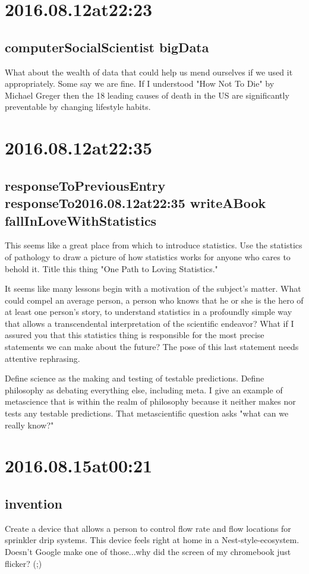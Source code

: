 \section*{ 2016.08.12at22:23 }
\subsection*{computerSocialScientist bigData}
What about the wealth of data that could help us mend ourselves if we used it appropriately. Some say we are fine. If I understood "How Not To Die" by Michael Greger then the 18 leading causes of death in the US are significantly preventable by changing lifestyle habits.

\section*{ 2016.08.12at22:35 }
\subsection*{responseToPreviousEntry responseTo2016.08.12at22:35 writeABook fallInLoveWithStatistics}
This seems like a great place from which to introduce statistics. Use the statistics of pathology to draw a picture of how statistics works for anyone who cares to behold it. Title this thing "One Path to Loving Statistics."

It seems like many lessons begin with a motivation of the subject's matter. What could compel an average person, a person who knows that he or she is the hero of at least one person's story, to understand statistics in a profoundly simple way that allows a transcendental interpretation of the scientific endeavor? What if I assured you that this statistics thing is responsible for the most precise statements we can make about the future? The pose of this last statement needs attentive rephrasing.

Define science as the making and testing of testable predictions. Define philosophy as debating everything else, including meta. I give an example of metascience that is within the realm of philosophy because it neither makes nor tests any testable predictions. That metascientific question asks "what can we really know?"



\section*{ 2016.08.15at00:21 }
\subsection*{invention}
Create a device that allows a person to control flow rate and flow locations for sprinkler drip systems. This device feels right at home in a Nest-style-ecosystem. Doesn't Google make one of those...why did the screen of my chromebook just flicker? (;)

